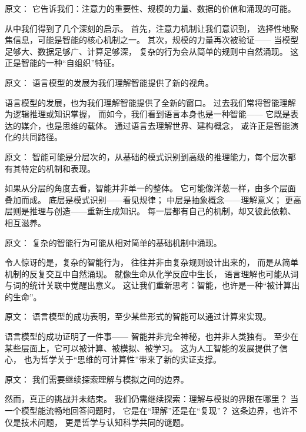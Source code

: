 原文：
它告诉我们：注意力的重要性、规模的力量、数据的价值和涌现的可能。  

从中我们得到了几个深刻的启示。  
首先，注意力机制让我们意识到，  
选择性地聚焦信息，可能是智能的核心机制之一。  
其次，规模的力量再次被验证——  
当模型足够大、数据足够广、计算足够深，  
复杂的行为会从简单的规则中自然涌现。  
这正是智能的一种“自组织”特征。  



原文：
语言模型的发展为我们理解智能提供了新的视角。  

语言模型的发展，也为我们理解智能提供了全新的窗口。  
过去我们常将智能理解为逻辑推理或知识掌握，  
而如今，我们看到语言本身也是一种智能——  
它既是表达的媒介，也是思维的载体。  
通过语言去理解世界、建构概念，  
或许正是智能演化的共同路径。  



原文：
智能可能是分层次的，从基础的模式识别到高级的推理能力，每个层次都有其特定的机制和表现。  

如果从分层的角度去看，智能并非单一的整体。  
它可能像洋葱一样，由多个层面叠加而成。  
底层是模式识别——看见规律；  
中层是抽象概念——理解意义；  
更高层则是推理与创造——重新生成知识。  
每一层都有自己的机制，却又彼此依赖、相互滋养。  



原文：
复杂的智能行为可能从相对简单的基础机制中涌现。  

令人惊讶的是，复杂的智能行为，  
往往并非由复杂规则设计出来的，  
而是从简单机制的反复交互中自然涌现。  
就像生命从化学反应中生长，  
语言理解也可能从词与词的统计关联中觉醒出意义。  
这让我们重新思考：智能，也许是一种“被计算出的生命”。  



原文：
语言模型的成功表明，至少某些形式的智能可以通过计算来实现。  

语言模型的成功证明了一件事——  
智能并非完全神秘，也并非人类独有。  
至少在某些层面上，它可以被计算、被模拟、被学习。  
这为人工智能的发展提供了信心，  
也为哲学关于“思维的可计算性”带来了新的实证支撑。  



原文：
我们需要继续探索理解与模拟之间的边界。  

然而，真正的挑战并未结束。  
我们仍需继续探索：理解与模拟的界限在哪里？  
当一个模型能流畅地回答问题时，  
它是在“理解”还是在“复现”？  
这条边界，也许不仅是技术问题，  
更是哲学与认知科学共同的谜题。  



